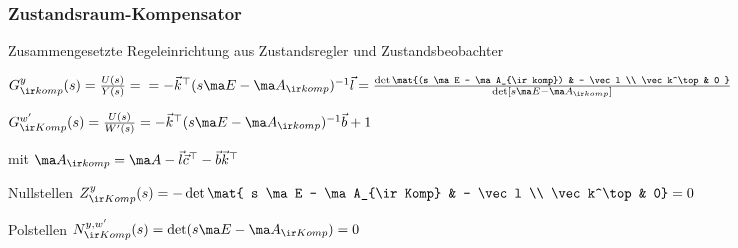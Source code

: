 \documentclass[german]{latex4ei/latex4ei_sheet}
\begin{document}
\begin{sectionbox}
		\subsubsection{Zustandsraum-Kompensator}
		Zusammengesetzte Regeleinrichtung aus Zustandsregler und Zustandsbeobachter


		$G^y_{\ir komp} (s)= \frac{U(s)}{Y(s)} =\\ =
		- \vec k^\top (s \ma E - \ma A_{\ir komp})^{-1} \vec l =
		 \frac{\det \mat{(s \ma E - \ma A_{\ir komp}) & - \vec l \\ \vec k^\top & 0 }}
		 {\det \left[  s \ma E - \ma A_{\ir komp} \right]}$

		$G^{w'}_{\ir Komp} (s) = \frac{U(s)}{W'(s)} = - \vec k^\top (s \ma E - \ma A_{\ir komp})^{-1} \vec b + 1$

		mit $\ma A_{\ir komp} = \ma A - \vec l \vec c^\top - \vec b \vec k^\top$

		Nullstellen
		$Z^y_{\ir Komp} (s) = - \det \mat{ s \ma E - \ma A_{\ir Komp} & - \vec l \\ \vec k^\top & 0} = 0$

		Polstellen
		$N^{y, w'}_{\ir Komp} (s) = \det (s \ma E - \ma A_{\ir Komp}) = 0 $
\end{sectionbox}

\end{document}
